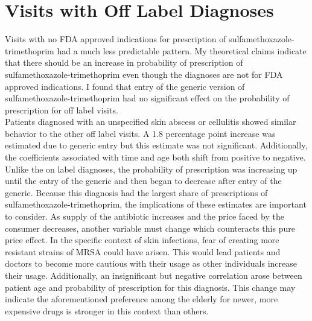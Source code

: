 \section{Visits with Off Label Diagnoses}
\indent Visits with no FDA approved indications for prescription of sulfamethoxazole-trimethoprim had a much less predictable pattern. My theoretical claims indicate that there should be an increase in probability of prescription of sulfamethoxazole-trimethoprim even though the diagnoses are not for FDA approved indications. I found that entry of the generic version of sulfamethoxazole-trimethoprim had no significant effect on the probability of prescription for off label visits.\\
\indent Patients diagnosed with an unspecified skin abscess or cellulitis showed similar behavior to the other off label visits. A 1.8 percentage point increase was estimated due to generic entry but this estimate was not significant. Additionally, the coefficients associated with time and age both shift from positive to negative. Unlike the on label diagnoses, the probability of prescription was increasing up until the entry of the generic and then began to decrease after entry of the generic. Because this diagnosis had the largest share of prescriptions of sulfamethoxazole-trimethoprim, the implications of these estimates are important to consider. As supply of the antibiotic increases and the price faced by the consumer decreases, another variable must change which counteracts this pure price effect. In the specific context of skin infections, fear of creating more resistant strains of MRSA could have arisen. This would lead patients and doctors to become more cautious with their usage as other individuals increase their usage. Additionally, an insignificant but negative correlation arose between patient age and probability of prescription for this diagnosis. This change may indicate the aforementioned preference among the elderly for newer, more expensive drugs \cite{kianmehr_system_2020} is stronger in this context than others.